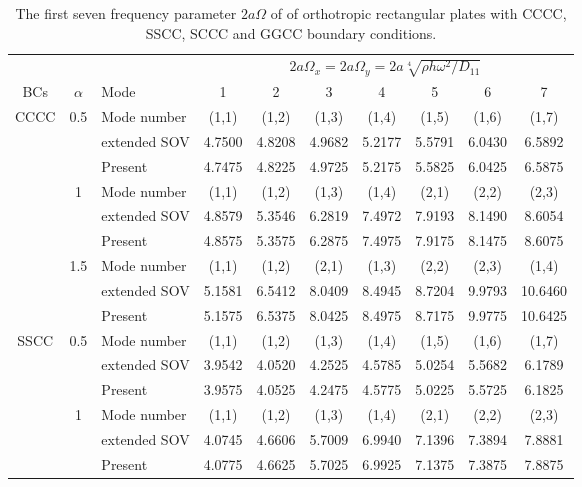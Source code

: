 \documentclass[preprint,12pt]{elsarticle}
\begin{document}
\begin{table}[!htbp] 
	\centering
	\caption{The first seven frequency parameter $2a\Omega$ of of orthotropic rectangular plates with CCCC, SSCC, SCCC and GGCC boundary conditions.}
	\begin{tabular}{c c l c c c c c c c}
		\toprule
		\multicolumn{3}{c}{} & \multicolumn{7}{c}{$2a\Omega_x=2a\Omega_y=2a\sqrt[4]{\rho h \omega^2/D_{11}}$} \\ 
		\cmidrule(lr){4-10}
		BCs & $\alpha$ & Mode & 1 & 2 & 3 & 4 & 5 & 6 & 7 \\
		\midrule
		CCCC & 0.5 & Mode number  & (1,1) & (1,2) & (1,3) & (1,4) & (1,5) & (1,6) & (1,7) \\
		&     & extended SOV \Citealp{xing2020extended}   & 4.7500 & 4.8208 & 4.9682 & 5.2177 & 5.5791 & 6.0430 & 6.5892 \\
		&     & Present       & 4.7475 & 4.8225 & 4.9725 & 5.2175 & 5.5825 & 6.0425 & 6.5875 \\
		& 1   & Mode number   & (1,1) & (1,2) & (1,3) & (1,4) & (2,1) & (2,2) & (2,3) \\
		&     & extended SOV \Citealp{xing2020extended}   & 4.8579 & 5.3546 & 6.2819 & 7.4972 & 7.9193 & 8.1490 & 8.6054 \\
		&     & Present       & 4.8575 & 5.3575 & 6.2875 & 7.4975 & 7.9175 & 8.1475 & 8.6075 \\
		& 1.5 & Mode number   & (1,1) & (1,2) & (2,1) & (1,3) & (2,2) & (2,3) & (1,4) \\
		&     & extended SOV \Citealp{xing2020extended}   & 5.1581 & 6.5412 & 8.0409 & 8.4945 & 8.7204 & 9.9793 & 10.6460 \\
		&     & Present       & 5.1575 & 6.5375 & 8.0425 & 8.4975 & 8.7175 & 9.9775 & 10.6425 \\
		SSCC & 0.5 & Mode number   & (1,1) & (1,2) & (1,3) & (1,4) & (1,5) & (1,6) & (1,7) \\
		&     & extended SOV \Citealp{xing2020extended}   & 3.9542 & 4.0520 & 4.2525 & 4.5785 & 5.0254 & 5.5682 & 6.1789 \\
		&     & Present       & 3.9575 & 4.0525 & 4.2475 & 4.5775 & 5.0225 & 5.5725 & 6.1825 \\
		& 1   & Mode number  & (1,1) & (1,2) & (1,3) & (1,4) & (2,1) & (2,2) & (2,3) \\
		&     & extended SOV \Citealp{xing2020extended}   & 4.0745 & 4.6606 & 5.7009 & 6.9940 & 7.1396 & 7.3894 & 7.8881 \\
		&     & Present       & 4.0775 & 4.6625 & 5.7025 & 6.9925 & 7.1375 & 7.3875 & 7.8875 \\

\end{tabular}
\end{table}
\end{document}

